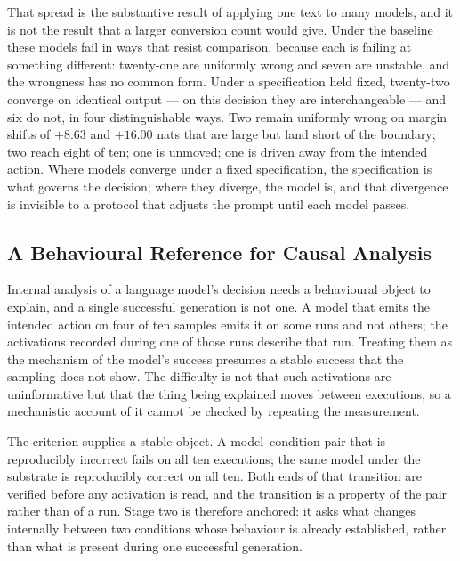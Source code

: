 That spread is the substantive result of applying one text to many models, and it is
not the result that a larger conversion count would give. Under the baseline these
models fail in ways that resist comparison, because each is failing at something
different: twenty-one are uniformly wrong and seven are unstable, and the wrongness
has no common form. Under a specification held fixed, twenty-two converge on
identical output --- on this decision they are interchangeable --- and six do not, in
four distinguishable ways. Two remain uniformly wrong on margin shifts of $+8.63$ and
$+16.00$ nats that are large but land short of the boundary; two reach eight of ten;
one is unmoved; one is driven away from the intended action. Where models converge
under a fixed specification, the specification is what governs the decision; where
they diverge, the model is, and that divergence is invisible to a protocol that
adjusts the prompt until each model passes.


\subsection{A Behavioural Reference for Causal Analysis}
\label{sec:behavioural-reference}

Internal analysis of a language model's decision needs a behavioural object to
explain, and a single successful generation is not one. A model that emits the
intended action on four of ten samples emits it on some runs and not others; the
activations recorded during one of those runs describe that run. Treating them as
the mechanism of the model's success presumes a stable success that the sampling
does not show. The difficulty is not that such activations are uninformative but
that the thing being explained moves between executions, so a mechanistic account
of it cannot be checked by repeating the measurement.

The criterion supplies a stable object. A model--condition pair that is reproducibly
incorrect fails on all ten executions; the same model under the substrate is
reproducibly correct on all ten. Both ends of that transition are verified before
any activation is read, and the transition is a property of the pair rather than of
a run. Stage two is therefore anchored: it asks what changes internally between two
conditions whose behaviour is already established, rather than what is present
during one successful generation.

